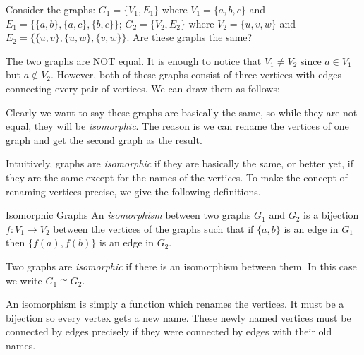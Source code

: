 \documentclass[12pt]{article}
\begin{document}
\begin{example}
Consider the graphs: $G_1 = \{V_1, E_1\}$ where $V_1 = \{a, b, c\}$ and $E_1 = \{\{a,b\}, \{a,c\}, \{b,c\}\}$; $G_2 = \{V_2, E_2\}$ where $V_2 = \{u,v,w\}$ and $E_2 = \{\{u,v\}, \{u,w\}, \{v,w\}\}$.  
Are these graphs the same?

\begin{solution}
The two graphs are NOT equal.  It is enough to notice that $V_1 \ne V_2$ since $a \in V_1$ but $a \notin V_2$.  However, both of these graphs consist of three vertices with edges connecting every pair of vertices.  We can draw them as follows:

\begin{center}
\qquad
{}
\end{center}
Clearly we want to say these graphs are basically the same, so while they are not equal, they will be \emph{isomorphic}.  The reason is we can rename the vertices of one graph and get the second graph as the result.
\end{solution}
\end{example}

Intuitively, graphs are \emph{isomorphic} if they are basically the same, or better yet, if they are the same except for the names of the vertices.  To make the concept of renaming vertices precise, we give the following definitions.

\begin{defbox}{Isomorphic Graphs}
An \emph{isomorphism} between two graphs $G_1$ and $G_2$ is a bijection $f:V_1 \to V_2$ between the vertices of the graphs such that if $\{a,b\}$ is an edge in $G_1$ then $\{f(a), f(b)\}$ is an edge in $G_2$.

Two graphs are \emph{isomorphic} if there is an isomorphism between them.  In this case we write $G_1 \cong G_2$.
\end{defbox}

An isomorphism is simply a function which renames the vertices.  It must be a bijection so every vertex gets a new name.  These newly named vertices must be connected by edges precisely if they were connected by edges with their old names.
\end{document}
